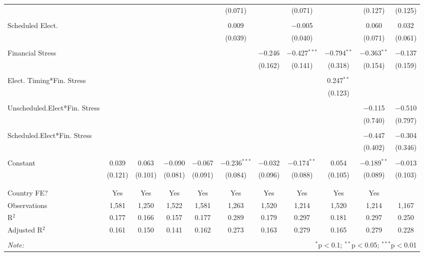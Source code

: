 \begin{table}[!htbp]
\begin{tabular}{@{\extracolsep{5pt}}lcccccccccc}
  &  &  &  &  & (0.071) &  & (0.071) &  & (0.127) & (0.125) \\ 
  & & & & & & & & & & \\ 
 Scheduled Elect. &  &  &  &  & 0.009 &  & $-$0.005 &  & 0.060 & 0.032 \\ 
  &  &  &  &  & (0.039) &  & (0.040) &  & (0.071) & (0.061) \\ 
  & & & & & & & & & & \\ 
 Financial Stress &  &  &  &  &  & $-$0.246 & $-$0.427$^{***}$ & $-$0.794$^{**}$ & $-$0.363$^{**}$ & $-$0.137 \\ 
  &  &  &  &  &  & (0.162) & (0.141) & (0.318) & (0.154) & (0.159) \\ 
  & & & & & & & & & & \\ 
 Elect. Timing*Fin. Stress &  &  &  &  &  &  &  & 0.247$^{**}$ &  &  \\ 
  &  &  &  &  &  &  &  & (0.123) &  &  \\ 
  & & & & & & & & & & \\ 
 Unscheduled.Elect*Fin. Stress &  &  &  &  &  &  &  &  & $-$0.115 & $-$0.510 \\ 
  &  &  &  &  &  &  &  &  & (0.740) & (0.797) \\ 
  & & & & & & & & & & \\ 
 Scheduled.Elect*Fin. Stress &  &  &  &  &  &  &  &  & $-$0.447 & $-$0.304 \\ 
  &  &  &  &  &  &  &  &  & (0.402) & (0.346) \\ 
  & & & & & & & & & & \\ 
 Constant & 0.039 & 0.063 & $-$0.090 & $-$0.067 & $-$0.236$^{***}$ & $-$0.032 & $-$0.174$^{**}$ & 0.054 & $-$0.189$^{**}$ & $-$0.013 \\ 
  & (0.121) & (0.101) & (0.081) & (0.091) & (0.084) & (0.096) & (0.088) & (0.105) & (0.089) & (0.103) \\ 
  & & & & & & & & & & \\ 
\hline \\[-1.8ex] 
Country FE? & Yes & Yes & Yes & Yes & Yes & Yes & Yes & Yes & Yes &  \\ 
Observations & 1,581 & 1,250 & 1,522 & 1,581 & 1,263 & 1,520 & 1,214 & 1,520 & 1,214 & 1,167 \\ 
R$^{2}$ & 0.177 & 0.166 & 0.157 & 0.177 & 0.289 & 0.179 & 0.297 & 0.181 & 0.297 & 0.250 \\ 
Adjusted R$^{2}$ & 0.161 & 0.150 & 0.141 & 0.162 & 0.273 & 0.163 & 0.279 & 0.165 & 0.279 & 0.228 \\ 
\hline 
\hline \\[-1.8ex] 
\textit{Note:}  & \multicolumn{10}{r}{$^{*}$p$<$0.1; $^{**}$p$<$0.05; $^{***}$p$<$0.01} \\ 
\end{tabular} 
\end{table} 
